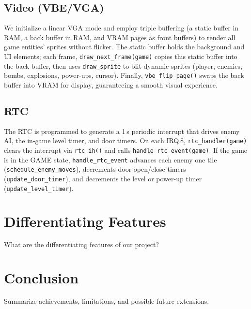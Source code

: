 \documentclass[12pt,a4paper]{article}
\begin{document}
\subsection*{Video (VBE/VGA)}
We initialize a linear VGA mode and employ triple buffering (a static buffer in RAM, a back buffer in RAM, and VRAM pages as front buffers) to render all game entities’ sprites without flicker. The static buffer holds the background and UI elements; each frame, \texttt{draw\_next\_frame(game)} copies this static buffer into the back buffer, then uses \texttt{draw\_sprite} to blit dynamic sprites (player, enemies, bombs, explosions, power-ups, cursor). Finally, \texttt{vbe\_flip\_page()} swaps the back buffer into VRAM for display, guaranteeing a smooth visual experience.

\subsection*{RTC}
The RTC is programmed to generate a 1 s periodic interrupt that drives enemy AI, the in-game level timer, and door timers. On each IRQ 8, \texttt{rtc\_handler(game)} clears the interrupt via \texttt{rtc\_ih()} and calls \texttt{handle\_rtc\_event(game)}. If the game is in the GAME state, \texttt{handle\_rtc\_event} advances each enemy one tile (\texttt{schedule\_enemy\_moves}), decrements door open/close timers (\texttt{update\_door\_timer}), and decrements the level or power-up timer (\texttt{update\_level\_timer}).

\section{Differentiating Features}
What are the differentiating features of our project?

\section{Conclusion}
Summarize achievements, limitations, and possible future extensions.
\end{document}
